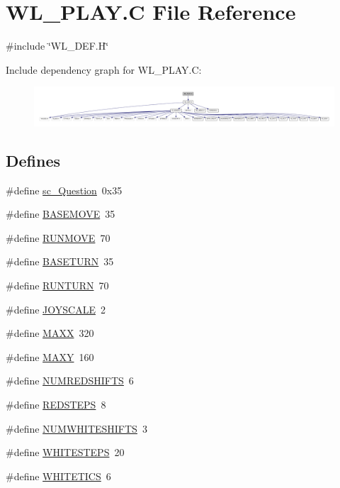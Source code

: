 \hypertarget{WL__PLAY_8C}{
\section{WL\_\-PLAY.C File Reference}
\label{WL__PLAY_8C}
}
{\ttfamily \#include \char`\"{}WL\_\-DEF.H\char`\"{}}\par
Include dependency graph for WL\_\-PLAY.C:
\nopagebreak
\begin{figure}[H]
\begin{center}
\leavevmode
\includegraphics[width=400pt]{WL__PLAY_8C__incl}
\end{center}
\end{figure}
\subsection*{Defines}
\begin{DoxyCompactItemize}
\item 
\#define \hyperlink{WL__PLAY_8C_a42ab74830eae12bd71ffd50128828f03}{sc\_\-Question}~0x35
\item 
\#define \hyperlink{WL__PLAY_8C_ac120c9862b4140e3f3b9bb6aaad6013d}{BASEMOVE}~35
\item 
\#define \hyperlink{WL__PLAY_8C_a4bcabd3b2997298e8cc763b099b706b7}{RUNMOVE}~70
\item 
\#define \hyperlink{WL__PLAY_8C_a3a2b917f95e7f8f9a5141fae0bb9b757}{BASETURN}~35
\item 
\#define \hyperlink{WL__PLAY_8C_a8cca6973a6865f19e5f000c12fd74d2b}{RUNTURN}~70
\item 
\#define \hyperlink{WL__PLAY_8C_ae6dd494737de7bf6861cfefffb18288a}{JOYSCALE}~2
\item 
\#define \hyperlink{WL__PLAY_8C_a7bb5845dcf8072f09f0a8d246b47e032}{MAXX}~320
\item 
\#define \hyperlink{WL__PLAY_8C_a25602e1c79852e5be195490eceff513f}{MAXY}~160
\item 
\#define \hyperlink{WL__PLAY_8C_aa03e114d2c4f071feea44ba13072b4d3}{NUMREDSHIFTS}~6
\item 
\#define \hyperlink{WL__PLAY_8C_a591c8126ebe86a2bdf68ec4d26d1bd6a}{REDSTEPS}~8
\item 
\#define \hyperlink{WL__PLAY_8C_aa1820e26a699a6152c28af99cd5f2e16}{NUMWHITESHIFTS}~3
\item 
\#define \hyperlink{WL__PLAY_8C_a6829288fda11b8e39e3cb50e999ec127}{WHITESTEPS}~20
\item 
\#define \hyperlink{WL__PLAY_8C_a819d82401803c20efd7aaa43da8ae021}{WHITETICS}~6
\end{DoxyCompactItemize}
